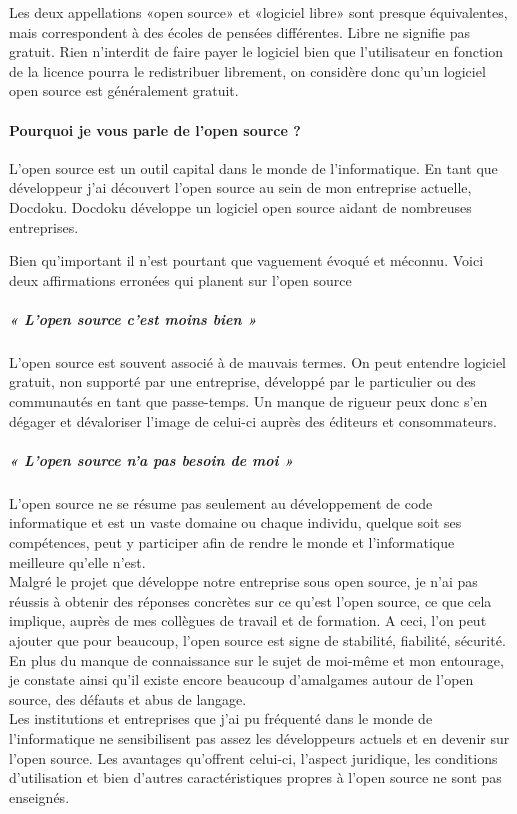 			Les deux appellations «open source» et «logiciel libre» sont presque équivalentes, mais correspondent à des écoles de pensées différentes. Libre ne signifie pas gratuit.
			Rien n'interdit de faire payer le logiciel bien que l'utilisateur en fonction de la licence pourra le redistribuer librement, on considère donc qu'un logiciel open source est généralement gratuit.
				
		\paragraph{Pourquoi je vous parle de l'open source ?\\}

			L'open source est un outil capital dans le monde de l'informatique.
			En tant que développeur j'ai découvert l'open source au sein de mon entreprise actuelle, Docdoku.
			Docdoku développe un logiciel open source aidant de nombreuses entreprises.

			Bien qu'important il n'est pourtant que vaguement évoqué et méconnu.
			Voici deux affirmations erronées qui planent sur l'open source 
			
			\subparagraph{« L'open source c'est moins bien »\\}

				L'open source est souvent associé à de mauvais termes. On peut entendre logiciel gratuit, non supporté par une entreprise, développé par le particulier ou des communautés en tant que passe-temps. Un manque de rigueur peux donc s'en dégager et dévaloriser l'image de celui-ci auprès des éditeurs et consommateurs.

			\subparagraph{« L'open source n'a pas besoin de moi »\\}

				L'open source ne se résume pas seulement au développement de code informatique et est un vaste domaine ou chaque individu, quelque soit ses compétences, peut y participer afin de rendre le monde et l'informatique meilleure qu'elle n'est.\\

			Malgré le projet que développe notre entreprise sous open source, je n'ai pas réussis à obtenir des réponses concrètes sur ce qu'est l'open source, ce que cela implique, auprès de mes collègues de travail et de formation. A ceci, l'on peut ajouter que pour beaucoup, l'open source est signe de stabilité, fiabilité, sécurité.\\

			En plus du manque de connaissance sur le sujet de moi-même et mon entourage, je constate ainsi qu'il existe encore beaucoup d'amalgames autour de l'open source, des défauts et abus de langage.\\
			Les institutions et entreprises que j'ai pu fréquenté dans le monde de l'informatique ne sensibilisent pas assez les développeurs actuels et en devenir sur l'open source. Les avantages qu'offrent celui-ci, l'aspect juridique, les conditions d'utilisation et bien d'autres caractéristiques propres à l'open source ne sont pas enseignés.\\

